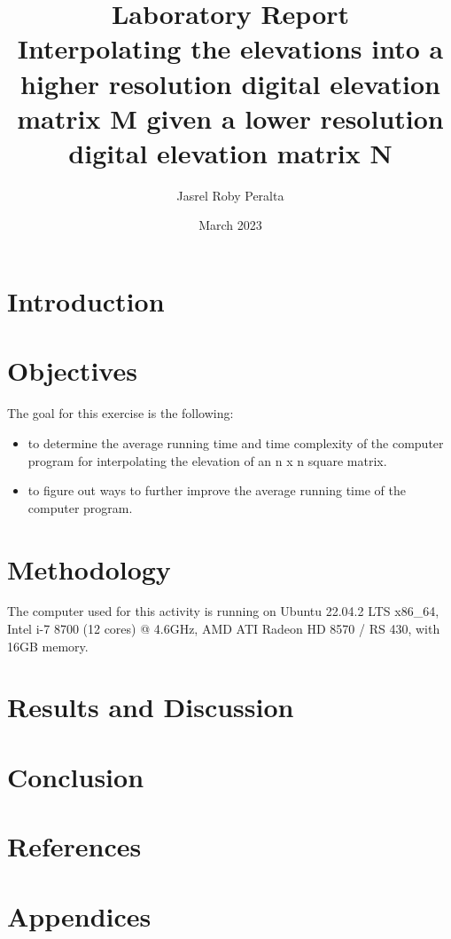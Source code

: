 \documentclass{article}
\title{%
\textbf{Laboratory Report} \\
\large Interpolating the elevations into a higher resolution digital elevation matrix M given a lower resolution digital elevation matrix N
}
\author{Jasrel Roby Peralta}
\date{March 2023}
\begin{document}
\maketitle

\section{Introduction}

\section{Objectives}
The goal for this exercise is the following:
\begin{itemize}
    \item to determine the average running time and time complexity of the computer program for interpolating the elevation of an n x n square matrix.
    \item to figure out ways to further improve the average running time of the computer program.
\end{itemize}
\section{Methodology}
The computer used for this activity is running on Ubuntu 22.04.2 LTS x86\_64, Intel i-7 8700 (12 cores) @ 4.6GHz, AMD ATI Radeon HD 8570 / RS 430, with 16GB memory.
\section{Results and Discussion}
\section{Conclusion}
\section{References}
\section{Appendices}
\end{document}
